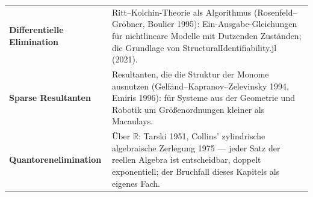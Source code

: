 \begin{forschung}
\begin{center}
{\small
\renewcommand{\arraystretch}{1.45}
\begin{tabular}{@{}P{3.0cm}P{5.2cm}@{}}
\toprule
\textbf{Differentielle Elimination} & Ritt--Kolchin-Theorie als Algorithmus (Rosenfeld--Gröbner, Boulier 1995): Ein-Ausgabe-Gleichungen für nichtlineare Modelle mit Dutzenden Zuständen; die Grundlage von StructuralIdentifiability.jl (2021).\\
\textbf{Sparse Resultanten} & Resultanten, die die Struktur der Monome ausnutzen (Gelfand--Kapranov--Zelevinsky 1994, Emiris 1996): für Systeme aus der Geometrie und Robotik um Größenordnungen kleiner als Macaulays.\\
\textbf{Quantoren\-elimination} & Über $\mathbb R$: Tarski 1951, Collins' zylindrische algebraische Zerlegung 1975 --- jeder Satz der reellen Algebra ist entscheidbar, doppelt exponentiell; der Bruchfall dieses Kapitels als eigenes Fach.\\
\bottomrule
\end{tabular}}
\end{center}

\begin{center}
\begin{minipage}{0.88\textwidth}
\end{minipage}
\end{center}
\end{forschung}

